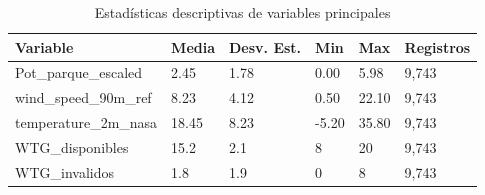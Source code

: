 \documentclass[conference]{IEEEtran}
\begin{document}
	\vspace{0.2cm}
	
	\begin{table}[htbp]
		\centering
		\caption{Estadísticas descriptivas de variables principales}
		\begin{tabular}{|p{2.5cm}|p{1.4cm}|p{1.4cm}|p{1.4cm}|p{1.4cm}|p{1.4cm}|}
			\hline
			\textbf{Variable} & \textbf{Media} & \textbf{Desv. Est.} & \textbf{Min} & \textbf{Max} & \textbf{Registros} \\
			\hline
			Pot\_parque\_escaled & 2.45 & 1.78 & 0.00 & 5.98 & 9,743 \\
			\hline
			wind\_speed\_90m\_ref & 8.23 & 4.12 & 0.50 & 22.10 & 9,743 \\
			\hline
			temperature\_2m\_nasa & 18.45 & 8.23 & -5.20 & 35.80 & 9,743 \\
			\hline
			WTG\_disponibles & 15.2 & 2.1 & 8 & 20 & 9,743 \\
			\hline
			WTG\_invalidos & 1.8 & 1.9 & 0 & 8 & 9,743 \\
			\hline
		\end{tabular}
		\label{tab:estadisticas_descriptivas}
	\end{table}
	
\end{document}
